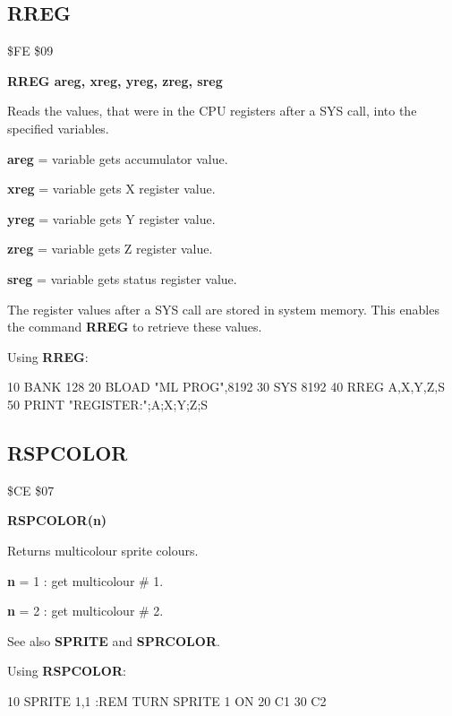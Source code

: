 \subsection{RREG}
\begin{description}[leftmargin=3cm,style=nextline]
\item [Token:] \$FE \$09
\item [Format:] {\bf RREG areg, xreg, yreg, zreg, sreg}
\item [Usage:] Reads the values, that were in the CPU registers
               after a SYS call, into the specified variables.

               {\bf areg} = variable gets accumulator value.

               {\bf xreg} = variable gets X register value.

               {\bf yreg} = variable gets Y register value.

               {\bf zreg} = variable gets Z register value.

               {\bf sreg} = variable gets status register value.

\item [Remarks:] The register values after a SYS call are stored
                 in system memory. This enables the command
                 {\bf RREG} to retrieve these values.

\item [Example:] Using {\bf RREG}:
\begin{screenoutput}
 10 BANK 128
 20 BLOAD "ML PROG",8192
 30 SYS 8192
 40 RREG A,X,Y,Z,S
 50 PRINT "REGISTER:";A;X;Y;Z;S
\end{screenoutput}
\end{description}


\newpage
\subsection{RSPCOLOR}
\begin{description}[leftmargin=3cm,style=nextline]
\item [Token:] \$CE \$07
\item [Format:] {\bf RSPCOLOR(n)} \\
\item [Usage:]  Returns multicolour sprite colours.

                {\bf n} = 1 : get multicolour \# 1.

                {\bf n} = 2 : get multicolour \# 2.


\item [Remarks:] See also {\bf SPRITE} and {\bf SPRCOLOR}.

\item [Example:] Using {\bf RSPCOLOR}:
\begin{screenoutput}
 10 SPRITE 1,1         :REM TURN SPRITE 1 ON
 20 C1%
 30 C2%
\end{screenoutput}
\end{description}

